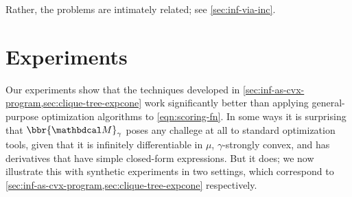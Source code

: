 Rather, the problems are intimately related; see \cref{sec:inf-via-inc}.

%
%
\section{Experiments} \label{sec:expts}


Our experiments show that the techniques developed in \cref{sec:inf-as-cvx-program,sec:clique-tree-expcone} work significantly better than applying general-purpose optimization algorithms to \eqref{eqn:scoring-fn}.
In some ways it is surprising that $\bbr{\dg M}_\gamma$ poses any challege at all to standard optimization tools, given that it is infinitely differentiable in $\mu$, $\gamma$-strongly convex, and has derivatives 
that have simple closed-form expressions.
%
But it does; we now illustrate this with
synthetic experiments in two settings, 
which correspond 
to \cref{sec:inf-as-cvx-program,sec:clique-tree-expcone}
respectively.


